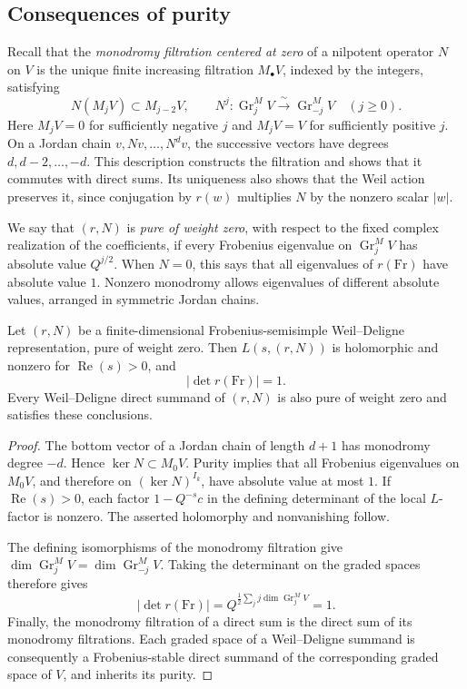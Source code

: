 \subsection{Consequences of purity}

Recall that the \emph{monodromy filtration centered at zero} of a
nilpotent operator $N$ on $V$ is the unique finite increasing
filtration $M_\bullet V$, indexed by the integers, satisfying
\[
 N(M_jV)\subset M_{j-2}V,
 \qquad
 N^j:\operatorname{Gr}^{M}_jV
      \xrightarrow{\ \sim\ }
      \operatorname{Gr}^{M}_{-j}V
 \quad (j\geq 0).
\]
Here $M_jV=0$ for sufficiently negative $j$ and $M_jV=V$ for
sufficiently positive $j$.  On a Jordan chain
$v,Nv,\ldots,N^dv$, the successive vectors have degrees
$d,d-2,\ldots,-d$.  This description constructs the filtration and
shows that it commutes with direct sums.  Its uniqueness also shows
that the Weil action preserves it, since conjugation by $r(w)$
multiplies $N$ by the nonzero scalar $|w|$.

We say that $(r,N)$ is \emph{pure of weight zero}, with respect to the
fixed complex realization of the coefficients, if every Frobenius
eigenvalue on $\operatorname{Gr}^{M}_jV$ has absolute value
$Q^{j/2}$.  When $N=0$, this says that all eigenvalues of
$r(\mathrm{Fr})$ have absolute value $1$.  Nonzero monodromy allows
eigenvalues of different absolute values, arranged in symmetric
Jordan chains.

\begin{lemma}\label{lem:pure-determinant}
Let $(r,N)$ be a finite-dimensional Frobenius-semisimple
Weil--Deligne representation, pure of weight zero.  Then
$L(s,(r,N))$ is holomorphic and nonzero for $\operatorname{Re}(s)>0$,
and
\begin{equation}\label{eq:pure-determinant}
 \left|\det r(\mathrm{Fr})\right|=1.
\end{equation}
Every Weil--Deligne direct summand of $(r,N)$ is also pure of weight
zero and satisfies these conclusions.
\end{lemma}

\begin{proof}
The bottom vector of a Jordan chain of length $d+1$ has monodromy
degree $-d$.  Hence $\ker N\subset M_0V$.  Purity implies that all
Frobenius eigenvalues on $M_0V$, and therefore on $(\ker N)^{I_k}$,
have absolute value at most $1$.  If $\operatorname{Re}(s)>0$, each
factor $1-Q^{-s}c$ in the defining determinant of the local
$L$-factor is nonzero.  The asserted holomorphy and nonvanishing
follow.

The defining isomorphisms of the monodromy filtration give
$\dim\operatorname{Gr}^{M}_jV
 =\dim\operatorname{Gr}^{M}_{-j}V$.  Taking the determinant on the
graded spaces therefore gives
\[
 \left|\det r(\mathrm{Fr})\right|
   =Q^{\frac12\sum_j j\dim\operatorname{Gr}^{M}_jV}=1.
\]
Finally, the monodromy filtration of a direct sum is the direct sum
of its monodromy filtrations.  Each graded space of a
Weil--Deligne summand is consequently a Frobenius-stable direct
summand of the corresponding graded space of $V$, and inherits its
purity.
\end{proof}

